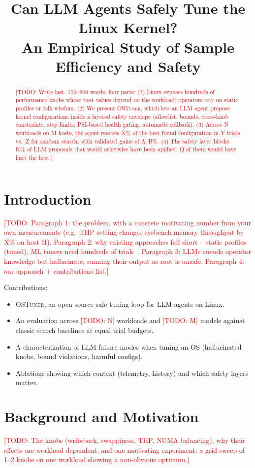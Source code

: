 \documentclass[10pt,twocolumn]{article}
\title{Can LLM Agents Safely Tune the Linux Kernel?\\
\large An Empirical Study of Sample Efficiency and Safety}
\author{\todo{Author names and affiliations}}
\date{}
\newcommand{\todo}[1]{\textcolor{red}{[TODO: #1]}}
\newcommand{\sys}{\textsc{OSTuner}}
\begin{document}
\maketitle

\begin{abstract}
\todo{Write last. 150--200 words, four parts: (1) Linux exposes hundreds of
performance knobs whose best values depend on the workload; operators rely on
static profiles or folk wisdom. (2) We present \sys{}, which lets an LLM agent
propose kernel configurations inside a layered safety envelope (allowlist,
bounds, cross-knob constraints, step limits, PSI-based health gating,
automatic rollback). (3) Across N workloads on M hosts, the agent reaches X\%
of the best found configuration in Y trials vs.\ Z for random search, with
validated gains of A--B\%. (4) The safety layer blocks K\% of LLM proposals
that would otherwise have been applied; Q of them would have hurt the host.}
\end{abstract}

\section{Introduction}
\todo{Paragraph 1: the problem, with a concrete motivating number from your own
measurements (e.g.\ THP setting changes sysbench memory throughput by X\% on
host H). Paragraph 2: why existing approaches fall short -- static profiles
(tuned), ML tuners need hundreds of trials~\cite{vanaken2017ottertune,zhu2017bestconfig}.
Paragraph 3: LLMs encode operator knowledge but hallucinate; running their
output as root is unsafe. Paragraph 4: our approach + contributions list.}

Contributions:
\begin{itemize}
  \item \sys{}, an open-source safe tuning loop for LLM agents on Linux.
  \item An evaluation across \todo{N} workloads and \todo{M} models against
        classic search baselines at equal trial budgets.
  \item A characterization of LLM failure modes when tuning an OS
        (hallucinated knobs, bound violations, harmful configs).
  \item Ablations showing which context (telemetry, history) and which safety
        layers matter.
\end{itemize}

\section{Background and Motivation}
\todo{The knobs (writeback, swappiness, THP, NUMA balancing), why their effects
are workload dependent, and one motivating experiment: a grid sweep of 1--2 knobs
on one workload showing a non-obvious optimum.}
\end{document}
